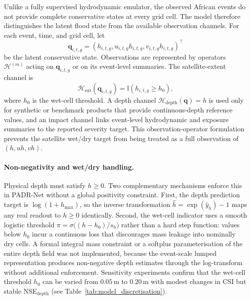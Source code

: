\documentclass[pdflatex,sn-mathphys-ay]{sn-jnl}
\theoremstyle{thmstyleone}
\begin{document}
Unlike a fully supervised hydrodynamic emulator, the observed African
events do not provide complete conservative states at every grid cell.
The model therefore distinguishes the latent flood state from the
available observation channels.  For each event, time, and grid cell,
let
\begin{equation}
  \mathbf{q}_{i,t,g}
  =
  \left(
    h_{i,t,g},
    u_{i,t,g}h_{i,t,g},
    v_{i,t,g}h_{i,t,g}
  \right)^{\top}
  \label{eq:latent_state}
\end{equation}
be the latent conservative state.  Observations are represented by
operators $\mathcal{H}^{(m)}$ acting on $\mathbf{q}_{i,t,g}$ or on
its event-level summaries.  The satellite-extent channel is
\begin{equation}
  \mathcal{H}_{\mathrm{ext}}
  \left(
    \mathbf{q}_{i,t,g}
  \right)
  =
  \mathbb{I}
  \left(
    h_{i,t,g}\geq h_{0}
  \right),
  \label{eq:extent_operator}
\end{equation}
where $h_{0}$ is the wet-cell threshold.  A depth channel
$\mathcal{H}_{\mathrm{depth}}(\mathbf{q})=h$ is used only for synthetic
or benchmark products that provide continuous-depth reference values,
and an impact channel links event-level hydrodynamic and exposure
summaries to the reported severity target.  This observation-operator
formulation prevents the satellite wet/dry target from being treated as
a full observation of $(h,uh,vh)$.

\paragraph{Non-negativity and wet/dry handling.}
Physical depth must satisfy $h\geq 0$.  Two complementary mechanisms
enforce this in PADR-Net without a global positivity constraint.
First, the depth prediction target is $\log(1+h_{\max})$, so the
inverse transformation $\hat{h}=\exp(\hat{y}_h)-1$ maps any real
readout to $h\geq 0$ identically.
Second, the wet-cell indicator uses a smooth logistic threshold
$\pi = \sigma\!\bigl((h-h_0)/s_h\bigr)$ rather than a hard step
function: values below $h_0$ incur a continuous loss that discourages
mass leakage into nominally dry cells.
A formal integral mass constraint or a softplus parameterisation of the
entire depth field was not implemented, because the event-scale lumped
representation produces non-negative depth estimates through the
log-transform without additional enforcement.
Sensitivity experiments confirm that the wet-cell threshold $h_0$ can
be varied from $0.05\,\mathrm{m}$ to $0.20\,\mathrm{m}$ with modest
changes in CSI but stable NSE$_{\mathrm{depth}}$ (see
Table~\ref{tab:model_discretisation}).
\end{document}
